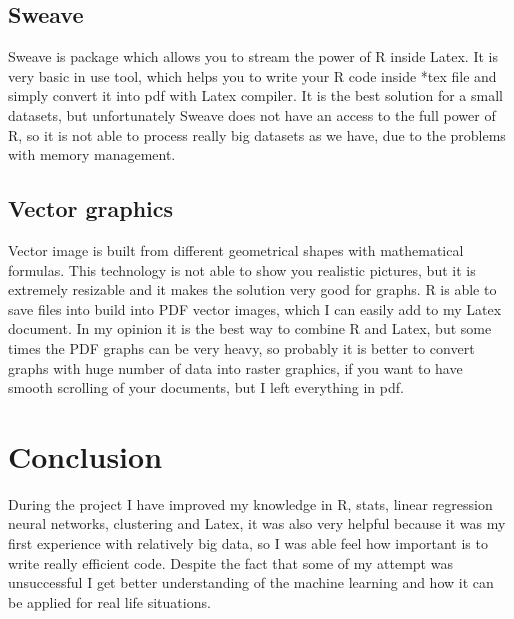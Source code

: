 \documentclass[english]{article}
\begin{document}
\subsection{Sweave}
Sweave is package which allows you to stream the power of R inside Latex. It is very basic in use tool, which helps you to write your R code inside *tex file and simply convert it into pdf with Latex compiler. It is the best solution for a small datasets, but unfortunately Sweave does not have an access to the full power of R, so it is not able to process really big datasets as we have, due to the problems with memory management.
\subsection{Vector graphics}
Vector image is built from different geometrical shapes with mathematical formulas. This technology is not able to show you realistic pictures, but it is extremely resizable and it makes the solution very good for graphs. R is able to save files into build into PDF vector images, which I can easily add to my Latex document. In my opinion it is the best way to combine R and Latex, but some times the PDF graphs can be very heavy, so probably it is better to convert graphs with huge number of data into raster graphics, if you want to have smooth scrolling of your documents, but I left everything in pdf.
\section{Conclusion}  
During the project I have improved my knowledge in R, stats, linear regression neural networks, clustering and Latex, it was also very helpful because it was my first experience with relatively big data, so I was able feel how  important is to write really efficient code. Despite the fact that some of my attempt was unsuccessful I get better understanding of the machine learning and how it can be applied for real life situations.
\newpage
\end{document}

